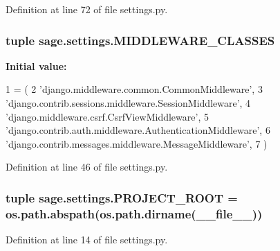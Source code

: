 Definition at line 72 of file settings.\+py.

\hypertarget{namespacesage_1_1settings_a247a0ea3c79f999897dbfaed3bc99b1d}{}
\subsubsection[{M\+I\+D\+D\+L\+E\+W\+A\+R\+E\+\_\+\+C\+L\+A\+S\+S\+E\+S}]{\setlength{\rightskip}{0pt plus 5cm}tuple sage.\+settings.\+M\+I\+D\+D\+L\+E\+W\+A\+R\+E\+\_\+\+C\+L\+A\+S\+S\+E\+S}\label{namespacesage_1_1settings_a247a0ea3c79f999897dbfaed3bc99b1d}
{\bfseries Initial value\+:}
\begin{DoxyCode}
1 = (
2     \textcolor{stringliteral}{'django.middleware.common.CommonMiddleware'},
3     \textcolor{stringliteral}{'django.contrib.sessions.middleware.SessionMiddleware'},
4     \textcolor{stringliteral}{'django.middleware.csrf.CsrfViewMiddleware'},
5     \textcolor{stringliteral}{'django.contrib.auth.middleware.AuthenticationMiddleware'},
6     \textcolor{stringliteral}{'django.contrib.messages.middleware.MessageMiddleware'},
7 )
\end{DoxyCode}


Definition at line 46 of file settings.\+py.

\hypertarget{namespacesage_1_1settings_ae2e71004e0684c0243b4e9792726cd0f}{}
\subsubsection[{P\+R\+O\+J\+E\+C\+T\+\_\+\+R\+O\+O\+T}]{\setlength{\rightskip}{0pt plus 5cm}tuple sage.\+settings.\+P\+R\+O\+J\+E\+C\+T\+\_\+\+R\+O\+O\+T = os.\+path.\+abspath(os.\+path.\+dirname(\+\_\+\+\_\+file\+\_\+\+\_\+))}\label{namespacesage_1_1settings_ae2e71004e0684c0243b4e9792726cd0f}


Definition at line 14 of file settings.\+py.

\hypertarget{namespacesage_1_1settings_a92b3d804acae3871a9877ad143df4201}{}
